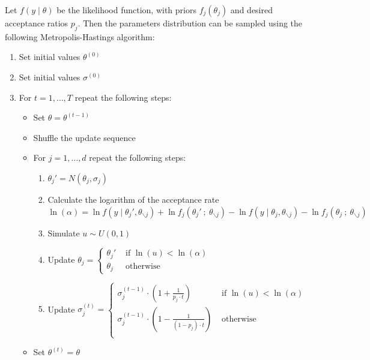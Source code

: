 \documentclass[11pt,fleqn]{book} %
\begin{document}
\begin{algorithm} 
	\label{alg:bimh}
	Let $f(y \mid \theta)$ be the likelihood function, with priors 
	$f_j(\theta_j)$ and desired acceptance ratios $p_j$. Then the 
	parameters distribution can be sampled using the following 
	Metropolis-Hastings algorithm:
	\begin{enumerate}
		\item Set initial values $\theta^{(0)}$
		\item Set initial values $\sigma^{(0)}$
		\item For $t=1,\dots,T$ repeat the following steps:
		\begin{itemize}
			\item Set $\theta=\theta^{(t-1)}$
			\item Shuffle the update sequence
			\item For $j=1,\dots,d$ repeat the following steps:
			\begin{enumerate}[label=\alph*.]
				\item $\theta_j' = N(\theta_j,\sigma_j)$
				\item Calculate the logarithm of the acceptance rate \\
				$\ln(\alpha) = 
					\ln f(y \mid \theta_j',\theta_{\backslash j}) + 
					\ln f_j(\theta_j'\ ;\ \theta_{\backslash j}) - 
					\ln f(y \mid \theta_j,\theta_{\backslash j}) - 
					\ln f_j(\theta_j\ ; \ \theta_{\backslash j})
				$
				\item Simulate $u \sim U(0,1)$
				\item Update $\theta_j=\left\{
				\begin{array}{ll}
					\theta_j' & \text{ if } \ln(u) < \ln(\alpha) \\
					\theta_j  & \text{ otherwise }               
				\end{array}\right.$ 
				\item Update $\sigma_j^{(t)} = \left\{
					\begin{array}{ll}
						\sigma_j^{(t-1)} \cdot \left( 1 + \frac{1}{p_j \cdot t} \right) & \text{ if } \ln(u) < \ln(\alpha) \\
						\sigma_j^{(t-1)} \cdot \left( 1 - \frac{1}{(1-p_j) \cdot t} \right) & \text{ otherwise } \\
					\end{array}
				\right.$
			\end{enumerate}
			\item Set $\theta^{(t)}=\theta$
		\end{itemize}
	\end{enumerate}
\end{algorithm}
\end{document}
